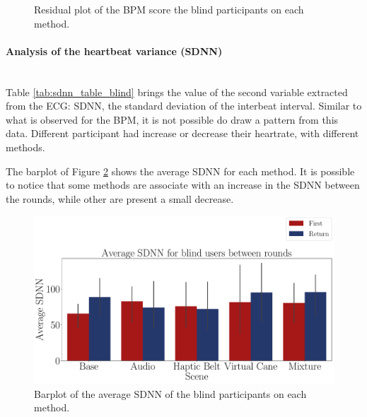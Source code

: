 \begin{figure}[!htb]
\begin{minipage}{0.45\textwidth}
        \caption{Residual plot of the BPM score the blind participants on each method.}
        \label{fig:residplot_bpm_two_way_blind}
    \end{minipage}
\end{figure}



%


\FloatBarrier

%
%
\paragraph{Analysis of the heartbeat variance (SDNN)}\mbox{}\\
%
Table \ref{tab:sdnn_table_blind} brings the value of the second variable extracted from the ECG: SDNN, the standard deviation of the interbeat interval. Similar to what is observed for the BPM, it is not possible do draw a pattern from this data. Different participant had increase or decrease their heartrate, with different methods.



The barplot of Figure \ref{fig:barplot_ecg_sdnn_5_scene_blind}  shows the average SDNN for each method. It is possible to notice that some methods are associate with an increase in the SDNN between the rounds, while other are present a small decrease.

\begin{figure}[!htb]
    \centering
    \includegraphics[width = \textwidth]{Resultados/ECG/Figuras/pdf/barplot_ecg_sdnn_5_scene_blind.pdf}
    \caption{Barplot of the average SDNN of the blind participants on each method.}
    \label{fig:barplot_ecg_sdnn_5_scene_blind}
\end{figure}

